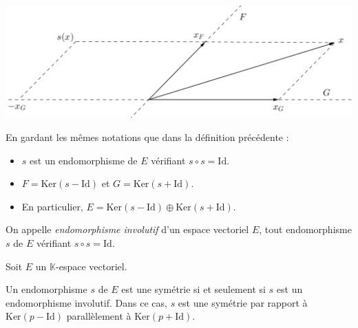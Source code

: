 \documentclass[french,11pt,twoside]{VcCours}
\begin{document}
\begin{center}
\includegraphics[scale=0.37]{Symetrie1}
\end{center}

\begin{Proposition}{} En gardant les mêmes notations que dans la définition précédente :
\begin{itemize}
\item $s$ est un endomorphisme de $E$ vérifiant $s \circ s = \textrm{Id}$.
\item $F = \textrm{Ker}(s-\textrm{Id})$ et $G= \textrm{Ker}(s+\textrm{Id})$.
\item En particulier, $E= \textrm{Ker}(s-\textrm{Id}) \oplus \textrm{Ker}(s+\textrm{Id})$.
\end{itemize}
\end{Proposition}

\begin{Demonstration}{}
\vspace{8cm}
\newpage
\phantom{test}

\vspace{7.5cm}

\end{Demonstration}

\begin{Definition}{} 
On appelle \emph{endomorphisme involutif} d'un espace vectoriel $E$, tout endomorphisme $s$ de $E$ vérifiant \newline $s \circ s = \textrm{Id}$.
\end{Definition}

\begin{Proposition}{} Soit $E$ un $\mathbb{K}$-espace vectoriel.

Un endomorphisme $s$ de $E$ est une symétrie si et seulement si $s$ est un 
endomorphisme involutif. Dans ce cas, $s$ est une symétrie par rapport à 
$\textrm{Ker}(p-\textrm{Id})$ parallèlement à $\textrm{Ker}(p+\textrm{Id})$.
\end{Proposition}

\newpage

\vspace*{7cm}
\end{document}
